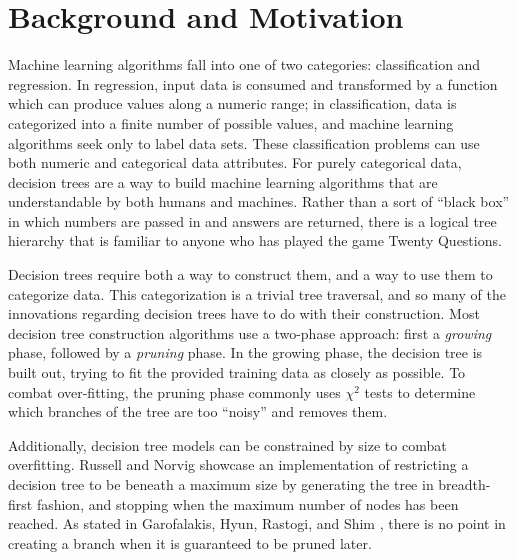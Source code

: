 \documentclass[screen, authorversion, nonacm, sigconf]{acmart}
\begin{document}


\maketitle

\section{Background and Motivation}

Machine learning algorithms fall into one of two categories: classification and regression. In regression, input data is consumed and transformed by a function which can produce values along a numeric range; in classification, data is categorized into a finite number of possible values, and machine learning algorithms seek only to label data sets. These classification problems can use both numeric and categorical data attributes. For purely categorical data, decision trees are a way to build machine learning algorithms that are understandable by both humans and machines. Rather than a sort of ``black box'' in which numbers are passed in and answers are returned, there is a logical tree hierarchy that is familiar to anyone who has played the game Twenty Questions.

Decision trees require both a way to construct them, and a way to use them to categorize data. This categorization is a trivial tree traversal, and so many of the innovations regarding decision trees have to do with their construction. Most decision tree construction algorithms use a two-phase approach: first a \emph{growing} phase, followed by a \emph{pruning} phase. In the growing phase, the decision tree is built out, trying to fit the provided training data as closely as possible. To combat over-fitting, the pruning phase commonly uses $\chi^2$ tests to determine which branches of the tree are too ``noisy'' and removes them.

Additionally, decision tree models can be constrained by size to combat overfitting. Russell and Norvig \cite{russell_norvig_2010} showcase an implementation of restricting a decision tree to be beneath a maximum size by generating the tree in breadth-first fashion, and stopping when the maximum number of nodes has been reached. As stated in Garofalakis, Hyun, Rastogi, and Shim \cite{Garofalakis:2000:EAC:347090.347163}, there is no point in creating a branch when it is guaranteed to be pruned later.
\end{document}
